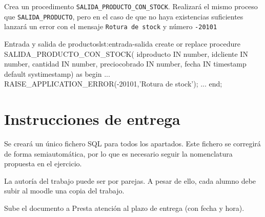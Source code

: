 \begin{homeworkProblem}

  Crea un procedimento \texttt{SALIDA\_PRODUCTO\_CON\_STOCK}. Realizará el mismo proceso que \texttt{SALIDA\_PRODUCTO}, pero en el caso de que no haya existencias suficientes lanzará un error con el mensaje \texttt{Rotura de stock} y número \texttt{-20101}

  \begin{listadosql}{Entrada y salida de productos}{lst:entrada-salida}
create or replace procedure SALIDA_PRODUCTO_CON_STOCK(
  idproducto IN number,
  idcliente IN number,
  cantidad IN number,
  preciocobrado IN number,
  fecha IN timestamp default systimestamp)
as
begin
  ...
  RAISE_APPLICATION_ERROR(-20101,'Rotura de stock');
  ...
end; 
  \end{listadosql}
  
\end{homeworkProblem}


\section{Instrucciones de entrega}
Se creará un único fichero SQL para todos los apartados. Este fichero se corregirá de forma semiautomática, por lo que es necesario seguir la nomenclatura propuesta en el ejercicio.

La autoría del trabajo puede ser por parejas. A pesar de ello, cada alumno debe subir al moodle una copia del trabajo.


Sube el documento a 
Presta atención al plazo de entrega (con fecha y hora).








